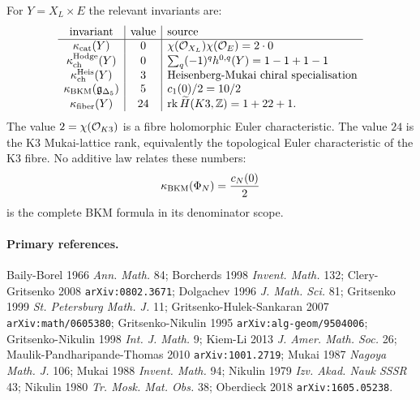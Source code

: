 For $Y=X_L\times E$ the relevant invariants are:
\[
\begin{array}{c|c|l}
\text{invariant} & \text{value} & \text{source}\\ \hline
\kappa_{\mathrm{cat}}(Y) & 0 &
  \chi(\mathcal{O}_{X_L})\chi(\mathcal{O}_E)=2\cdot0\\
\kappa_{\mathrm{ch}}^{\mathrm{Hodge}}(Y) & 0 &
  \sum_q(-1)^q h^{0,q}(Y)=1-1+1-1\\
\kappa_{\mathrm{ch}}^{\mathrm{Heis}}(Y) & 3 &
  \text{Heisenberg-Mukai chiral specialisation}\\
\kappa_{\mathrm{BKM}}(\mathfrak g_{\Delta_5}) & 5 &
  c_1(0)/2=10/2\\
\kappa_{\mathrm{fiber}}(Y) & 24 &
  \mathrm{rk}\,\widetilde H(K3,\mathbb{Z})=1+22+1 .
\end{array}
\]
The value $2=\chi(\mathcal{O}_{K3})$ is a fibre holomorphic Euler
characteristic.  The value $24$ is the K3 Mukai-lattice rank, equivalently
the topological Euler characteristic of the K3 fibre.  No additive law
relates these numbers:
\[
  \kappa_{\mathrm{BKM}}(\Phi_N)=\frac{c_N(0)}{2}
\]
is the complete BKM formula in its denominator scope.

\paragraph{Primary references.}
Baily-Borel 1966 \emph{Ann. Math.} 84;
Borcherds 1998 \emph{Invent. Math.} 132;
Clery-Gritsenko 2008 \texttt{arXiv:0802.3671};
Dolgachev 1996 \emph{J. Math. Sci.} 81;
Gritsenko 1999 \emph{St. Petersburg Math. J.} 11;
Gritsenko-Hulek-Sankaran 2007 \texttt{arXiv:math/0605380};
Gritsenko-Nikulin 1995 \texttt{arXiv:alg-geom/9504006};
Gritsenko-Nikulin 1998 \emph{Int. J. Math.} 9;
Kiem-Li 2013 \emph{J. Amer. Math. Soc.} 26;
Maulik-Pandharipande-Thomas 2010 \texttt{arXiv:1001.2719};
Mukai 1987 \emph{Nagoya Math. J.} 106;
Mukai 1988 \emph{Invent. Math.} 94;
Nikulin 1979 \emph{Izv. Akad. Nauk SSSR} 43;
Nikulin 1980 \emph{Tr. Mosk. Mat. Obs.} 38;
Oberdieck 2018 \texttt{arXiv:1605.05238}.
